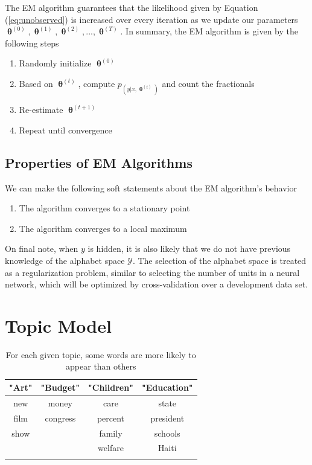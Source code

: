 \documentclass[justified, marginals=justified]{tufte-handout}
\theoremstyle{definition}
\begin{document}
The EM algorithm guarantees that the likelihood given by Equation (\ref{eq:unobserved}) is increased over every iteration as we update our parameters $\bm{\uptheta}^{(0)}, \bm{\uptheta}^{(1)}, 
\bm{\uptheta}^{(2)}, ..., \bm{\uptheta}^{(T)}$. In summary, the EM algorithm is given by the following steps

\begin{enumerate}
	\item
	Randomly initialize $\bm{\uptheta}^{(0)}$
	\item
	Based on $\bm{\uptheta}^{(t)}$, compute $p_(y|x, \bm{\uptheta}^{(t)})$ and count the fractionals
	\item
	Re-estimate $\bm{\uptheta}^{(t+1)}$
	\item
	Repeat until convergence
\end{enumerate}

\subsection{Properties of EM Algorithms}

We can make the following soft statements about the EM algorithm's behavior

\begin{enumerate}
	\item
	 The algorithm converges to a stationary point
	\item
	The algorithm converges to a local maximum
\end{enumerate}

On final note, when $y$ is hidden, it is also likely that we do not have previous knowledge of the alphabet space $\mathcal{Y}$. The selection of the alphabet space is treated as a regularization problem, similar to selecting the number of units in a neural network, which will be optimized by cross-validation over a development data set. 

\section{Topic Model}\label{sec:topic-model}

\begin{table}[h]
	\centering
	\caption{For each given topic, some words are more likely to appear than others}
	\begin{tabular}{cccc}
		\toprule
		"Art" & "Budget" & "Children" & "Education"  \\
		\midrule
		new & money & care & state \\
		film & congress & percent & president \\
		show & & family & schools \\
		& & welfare & Haiti \\
		\bottomrule \\
	\end{tabular}
\end{table}
\end{document}
